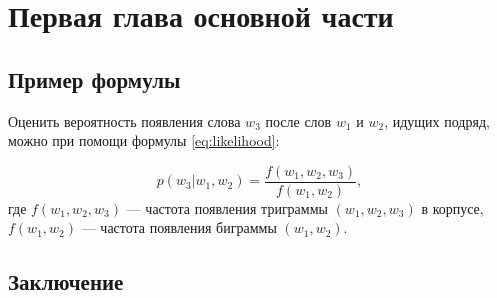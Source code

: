 \chapter{Первая глава основной части} \label{chap:1}

\section{Пример формулы}

Оценить вероятность появления слова $w_3$ после слов $w_1$ и $w_2$, идущих подряд, можно при помощи формулы \ref{eq:likelihood}:

\begin{equation}
  p(w_3|w_1,w_2) = \frac{f(w_1, w_2, w_3)}{f(w_1, w_2)},
  \label{eq:likelihood}
\end{equation}
%
где $f(w_1, w_2, w_3)$ --- частота появления триграммы $(w_1, w_2, w_3)$ в корпусе, $f(w_1, w_2)$ --- частота появления биграммы $(w_1, w_2)$.

\section{Заключение}
